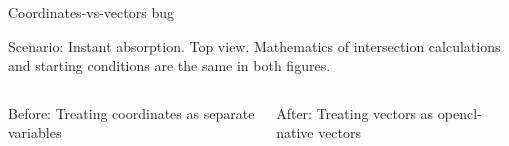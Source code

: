 
\begin{frame}[fragile]{Coordinates-vs-vectors bug}

  Scenario: Instant absorption. Top view.
  Mathematics of intersection calculations and starting conditions are the same in both figures.

  \begin{columns}
    \begin{column}{0.5\textwidth}

      Before: Treating coordinates as separate variables

    \end{column}
    \begin{column}{0.5\textwidth}

      After: Treating vectors as opencl-native vectors

    \end{column}
  \end{columns}

\end{frame}